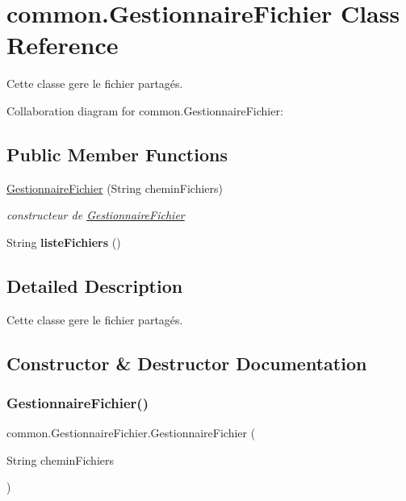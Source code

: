 \hypertarget{classcommon_1_1GestionnaireFichier}{}\section{common.\+Gestionnaire\+Fichier Class Reference}
\label{classcommon_1_1GestionnaireFichier}


Cette classe gere le fichier partagés.  




Collaboration diagram for common.\+Gestionnaire\+Fichier\+:
\subsection*{Public Member Functions}
\begin{DoxyCompactItemize}
\item 
\hyperlink{classcommon_1_1GestionnaireFichier_a6d898651fee5646b4d6a5d795a3b1884}{Gestionnaire\+Fichier} (String chemin\+Fichiers)
\begin{DoxyCompactList}\small\item\em constructeur de \hyperlink{classcommon_1_1GestionnaireFichier}{Gestionnaire\+Fichier} \end{DoxyCompactList}\item 
\mbox{\label{classcommon_1_1GestionnaireFichier_a7189336732591523f7490df6a16cae34}} 
String {\bfseries liste\+Fichiers} ()
\end{DoxyCompactItemize}


\subsection{Detailed Description}
Cette classe gere le fichier partagés. 

\subsection{Constructor \& Destructor Documentation}
\mbox{\label{classcommon_1_1GestionnaireFichier_a6d898651fee5646b4d6a5d795a3b1884}} 
\subsubsection{\texorpdfstring{Gestionnaire\+Fichier()}{GestionnaireFichier()}}
{\footnotesize\ttfamily common.\+Gestionnaire\+Fichier.\+Gestionnaire\+Fichier (\begin{DoxyParamCaption}\item[{String}]{chemin\+Fichiers }\end{DoxyParamCaption})\hspace{0.3cm}{\ttfamily [inline]}}



